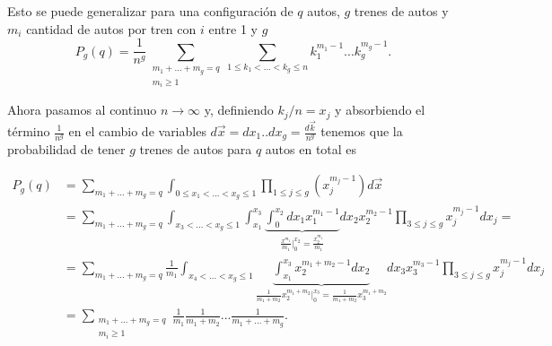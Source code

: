 \documentclass[letterpaper,12pt]{article}
\theoremstyle{plain}
\begin{document}
Esto se puede generalizar para una configuración de $q$ autos, $g$ trenes de autos y $m_i$ cantidad de autos por tren con $i$ entre 1 y $g$ 
\begin{equation}
    P_g(q) = \frac{1}{n^g} \sum_{\substack{m_1+...+m_g = q \\  m_i \geq 1}}  \sum_{1 \leq k_1 < ...< k_g \leq n} k_1^{m_1-1} ... k_g^{m_g-1}. 
\end{equation}

Ahora pasamos al continuo $n \to \infty$ y, definiendo $k_j/n = x_j$ y absorbiendo el término $\frac{1}{n^g}$ en el cambio de variables $d\vec{x} = dx_1 .. dx_g = \frac{d\vec{k}}{n^g}$ tenemos que la probabilidad de tener $g$ trenes de autos para $q$ autos en total es 

\begin{align}
P_g (q) &= \sum_{m_1+...+m_g = q} \int_{0 \leq x_1 < ... < x_g  \leq 1} \prod_{1 \leq j \leq g} (x_j^{m_j-1}) d\vec{x} \\
&= \sum_{m_1+...+m_g = q} \int_{x_3<...<x_g\leq 1} \int_{x_1}^{x_3} \underbrace{\int_0^{x_2} dx_1 x_1^{m_1-1}}_{\frac{x^{m_1}}{m_1}|_0^{x_2}  = \frac{x_2^{m_1}}{m_1}} dx_2 x_2^{m_2-1} \prod_{3 \leq j \leq g} x_j^{m_j-1} dx_j = \\
&= \sum_{m_1+...+m_g = q} \frac{1}{m_1}  \int_{x_4<...<x_g\leq 1} \underbrace{\int_{x_1}^{x_3} x_2^{m_1+m_2-1}  dx_2}_{\frac{1}{m_1+m_2} x_2^{m_1+m_2} |_0^{x_3} = \frac{1}{m_1+m_2} x_3^{m_1+m_2} } dx_3 x_3^{m_3-1} \prod_{3 \leq j \leq g} x_j^{m_j-1} dx_j  \\
&= \sum_{\substack{m_1+...+m_g = q \\ m_i \geq 1}} \frac{1}{m_1} \frac{1}{m_1+m_2} ... \frac{1}{m_1+ ... + m_g}.
\end{align} 
\end{document}
